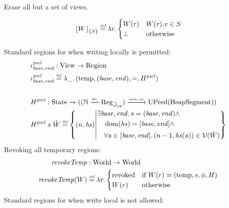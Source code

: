 \documentclass{article}
\DeclarePairedDelimiter\floor{\lfloor}{\rfloor}
\newcommand{\finparfun}{\xrightharpoonup{\textit{\tiny{fin}}}}
\newcommand{\monnefun}{\xrightarrow{\textit{\tiny{mon, ne}}}}
\newcommand{\fun}{\rightarrow}
\newcommand{\defeq}{\stackrel{\textit{\tiny{def}}}{=}}
\DeclareMathOperator{\dom}{dom}
\newcommand{\var}[1]{\mathit{#1}}
\newcommand{\hs}{\var{hs}}
\newcommand{\addr}{\var{a}}
\newcommand{\start}{\var{base}}
\newcommand{\addrend}{\var{end}}
\newcommand{\plainfun}[2]{
  \ifthenelse{\equal{#2}{}}
             {\mathit{#1}}
             {\mathit{#1}(#2)}
}
\newcommand{\revokeTemp}[1]{\plainfun{revokeTemp}{#1}}
\newcommand{\erase}[2]{\floor*{#1}_{\{#2\}}}
\newcommand{\futurewk}{\mathbin{\sqsupseteq}_{\var{wk}}}
\newcommand{\asmType}{\plaindom{AsmType}}
\newcommand{\plaindom}[1]{\mathrm{#1}}
\newcommand{\HeapSegments}{\plaindom{HeapSegment}}
\newcommand{\nats}{\mathbb{N}}
\newcommand{\States}{\plaindom{State}}
\newcommand{\Regions}{\plaindom{Region}}
\newcommand{\Reg}{\plaindom{Reg}}
\newcommand{\Regwk}{\Reg_{\futurewk}}
\newcommand{\Worlds}{\plaindom{World}}
\newcommand{\UPred}[1]{\plaindom{UPred}(#1)}
\newcommand{\Views}{\plaindom{View}}
\newcommand{\intr}[2]{\mathcal{#1}}
\newcommand{\valueintr}[1]{\intr{V}{#1}}
\newcommand{\stdvr}{\valueintr{\asmType}}
\newcommand{\npair}[2][n]{\left(#1,#2 \right)}
\newcommand{\plainview}[1]{\mathrm{#1}}
\newcommand{\temp}{\plainview{temp}}
\newcommand{\revoked}{\plainview{revoked}}
\begin{document}
Erase all but a set of views.

\begin{align*}
  \erase{W}{S} \defeq \lambda r \ldotp 
  \begin{cases}
    W(r) & W(r).v \in S\\
    \bot & \text{otherwise}
  \end{cases}
\end{align*}

Standard regions for when writing locally is permitted:
\begin{align*}
  &\iota_{\start,\addrend}^{\var{pwl}} : \Views \fun \Regions\\
  &\iota_{\start,\addrend}^{\var{pwl}} \defeq \lambda \_ \ldotp(\temp,(\start,\addrend),=,H^{\var{pwl}}) \\ \\
  &H^{\var{pwl}} : \States \fun ((\nats \finparfun \Regwk) \monnefun \UPred{\HeapSegments})\\
  &H^{\var{pwl}} \; s \; \hat{W} \defeq \left\{\npair{\hs} \middle|
    \begin{aligned}
      &\exists \start,\addrend \ldotp s = (\start,\addrend) \land \\
      &\quad \dom(\hs) = [\start,\addrend] \land \\
      &\quad \forall \addr \in [\start,\addrend] \ldotp \npair[n-1]{\hs(\addr)} \in \stdvr(\hat{W})
    \end{aligned}
  \right\}
\end{align*}
Revoking all temporary regions:
\begin{align*}
  \revokeTemp{} & : \Worlds \fun \Worlds \\
  \revokeTemp{W} & \defeq \lambda r \ldotp 
                   \begin{cases}
                     \revoked            & \text{if }W(r) = (\temp,s,\phi,H) \\
                     W(r)                & \text{otherwise}
                   \end{cases}
\end{align*}
Standard regions for when write local is not allowed:
\end{document}
